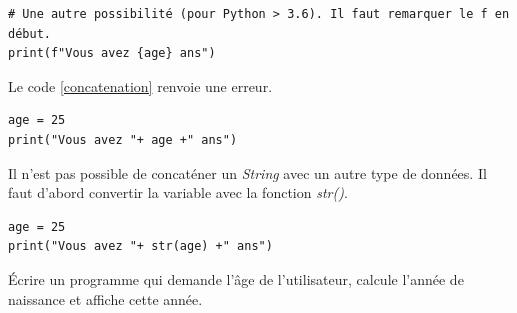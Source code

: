 \documentclass[a4paper,11pt]{article}
\begin{document}
\begin{Form}
\begin{code}[!h]
\begin{lstlisting}
# Une autre possibilité (pour Python > 3.6). Il faut remarquer le f en début.
print(f"Vous avez {age} ans")
\end{lstlisting}
\label{moncode}
\end{code}
\begin{aretenir}
Le code \ref{concatenation} renvoie une erreur.
\begin{center}
\begin{lstlisting}
age = 25
print("Vous avez "+ age +" ans")
\end{lstlisting}
\label{concatenation}
\end{center}
Il n'est pas possible de concaténer un \emph{String} avec un autre type de données. Il faut d'abord convertir la variable avec la fonction \emph{str()}.
\begin{center}
 \begin{lstlisting}
age = 25
print("Vous avez "+ str(age) +" ans")
 \end{lstlisting}
 \label{moncode}
 \end{center} 
\end{aretenir}
\begin{activite}
Écrire un programme qui demande l'âge de l'utilisateur, calcule l'année de naissance et affiche cette année.
\end{activite}

\end{Form}
\end{document}
